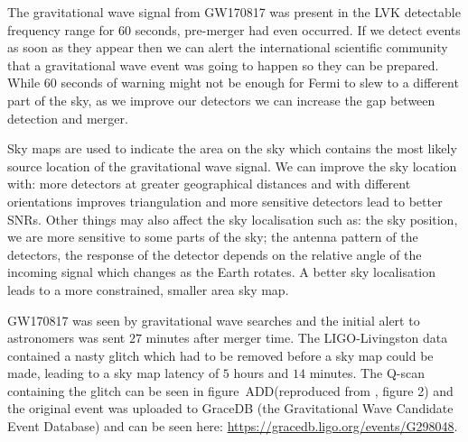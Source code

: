 The gravitational wave signal from GW170817 was present in the LVK detectable frequency range for $60$ seconds, pre-merger had even occurred. If we detect events as soon as they appear then we can alert the international scientific community that a gravitational wave event was going to happen so they can be prepared. While $60$ seconds of warning might not be enough for Fermi to slew to a different part of the sky, as we improve our detectors we can increase the gap between detection and merger.

Sky maps are used to indicate the area on the sky which contains the most likely source location of the gravitational wave signal. We can improve the sky location with: more detectors at greater geographical distances and with different orientations improves triangulation and more sensitive detectors lead to better SNRs. Other things may also affect the sky localisation such as: the sky position, we are more sensitive to some parts of the sky; the antenna pattern of the detectors, the response of the detector depends on the relative angle of the incoming signal which changes as the Earth rotates. A better sky localisation leads to a more constrained, smaller area sky map.

GW170817 was seen by gravitational wave searches and the initial alert to astronomers was sent $27$ minutes after merger time. The LIGO-Livingston data contained a nasty glitch which had to be removed before a sky map could be made, leading to a sky map latency of $5$ hours and $14$ minutes. The Q-scan containing the glitch can be seen in figure~ADD(reproduced from \cite{GW170817:2017}, figure 2) and the original event was uploaded to GraceDB (the Gravitational Wave Candidate Event Database) and can be seen here: \href{https://gracedb.ligo.org/events/G298048}{https://gracedb.ligo.org/events/G298048}.

